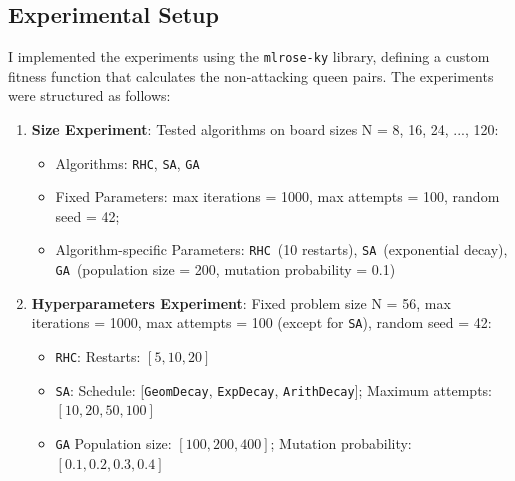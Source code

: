 \documentclass[conference]{IEEEtran}
\newcommand{\sa}{\texttt{SA}}
\newcommand{\ga}{\texttt{GA}}
\newcommand{\rhc}{\texttt{RHC}}
\newcommand{\expD}{\texttt{ExpDecay}}
\newcommand{\arithD}{\texttt{ArithDecay}}
\newcommand{\geomD}{\texttt{GeomDecay}}
\begin{document}
\subsection{Experimental Setup\label{sec:nqueens-experimental-setup}}
I implemented the experiments using the \texttt{mlrose-ky} library, defining a custom fitness function that calculates the non-attacking queen pairs. The experiments were structured as follows:
\begin{enumerate}
    \item \textbf{Size Experiment}: Tested algorithms on board sizes N = 8, 16, 24, ..., 120:
    \begin{itemize}
        \item Algorithms: \rhc, 
        \sa, \ga
        \item Fixed Parameters: max iterations = 1000, max attempts = 100, random seed = 42;
        \item Algorithm-specific Parameters: \rhc\ (10 restarts), \sa\ (exponential decay), \ga\ (population size = 200, mutation probability = 0.1)
    \end{itemize}
    \item \textbf{Hyperparameters Experiment}: Fixed problem size N = 56, max iterations = 1000, max attempts = 100 (except for \sa), random seed = 42:
    \begin{itemize}
        \item \rhc:  Restarts: $[5, 10, 20]$
        \item \sa: Schedule: [\geomD, \expD, \arithD];  Maximum attempts: $[10, 20, 50, 100]$
        \item \ga\: Population size: $[100, 200, 400]$; Mutation probability: $[0.1, 0.2, 0.3, 0.4]$
    \end{itemize}
\end{enumerate}
\end{document}
